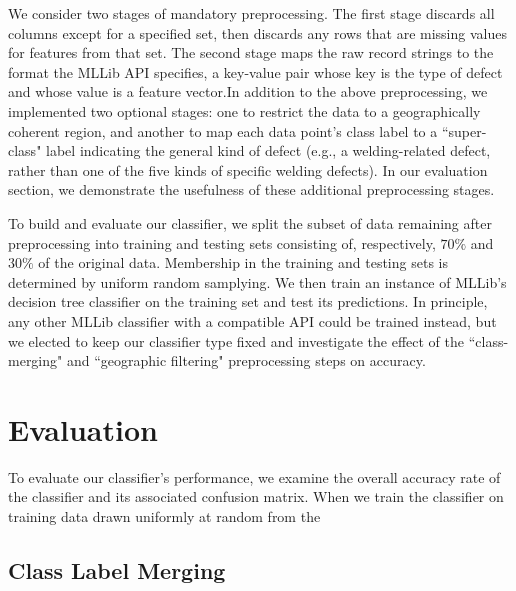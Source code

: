 \documentclass{sig-alternate-05-2015}
\begin{document}
We consider two stages of mandatory preprocessing. The first stage discards all columns except 
for a specified set, then discards any rows that are missing values for features from that set. 
The second stage maps the raw record strings to the format the MLLib API specifies, a key-value 
pair whose key is the type of defect and whose value is a feature vector.In addition to the
above preprocessing, we implemented two optional stages: one to restrict the data to a 
geographically coherent region, and another to map each data point's class label to a ``super-
class" label indicating the general kind of defect (e.g., a welding-related defect, rather than 
one of the five kinds of specific welding defects). In our evaluation section, we demonstrate
the usefulness of these additional preprocessing stages. 

To build and evaluate our classifier, we split the subset of data remaining after preprocessing into
training and testing sets consisting of, respectively, $70\%$ and $30\%$ of the original data. 
Membership in the training and testing sets is determined by uniform random samplying. We then 
train an instance of MLLib's decision tree classifier on the training set and test its predictions.
In principle, any other MLLib classifier with a compatible API could be trained instead, but we 
elected to keep our classifier type fixed and investigate the effect of the ``class-merging" and 
``geographic filtering" preprocessing steps on accuracy. 



\section{Evaluation}
To evaluate our classifier's performance, we examine the overall accuracy rate of the classifier
and its associated confusion matrix. When we train the classifier on training data drawn 
uniformly at random from the 

\subsection{Class Label Merging}
\end{document}
